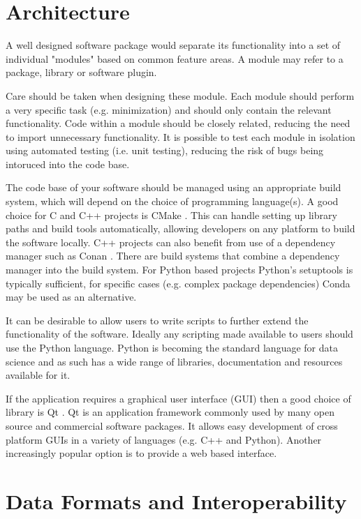 \documentclass[jnr]{iosart2x}
\begin{document}
\section{Architecture}
\label{Architecture}

A well designed software package would separate its functionality into a set of individual "modules" based on common feature areas. 
A module may refer to a package, library or software plugin.

Care should be taken when designing these module. 
Each module should perform a very specific task (e.g. minimization) and should only contain the relevant functionality.
Code within a module should be closely related, reducing the need to import unnecessary functionality.
It is possible to test each module in isolation using automated testing (i.e. unit testing), reducing the risk of bugs being intoruced into the code base.

The code base of your software should be managed using an appropriate build system, which will depend on the choice of programming language(s).
A good choice for C and C++ projects is CMake \cite{CMake}.
This can handle setting up library paths and build tools automatically, allowing developers on any platform to build the software locally.
C++ projects can also benefit from use of a dependency manager such as Conan \cite{Conan}.
There are build systems that combine a dependency manager into the build system.
For Python based projects Python's setuptools is typically sufficient, for specific cases (e.g. complex package dependencies) Conda may be used as an alternative.

It can be desirable to allow users to write scripts to further extend the functionality of the software. 
Ideally any scripting made available to users should use the Python language. 
Python is becoming the standard language for data science and as such has a wide range of libraries, documentation and resources available for it.

If the application requires a graphical user interface (GUI) then a good choice of library is Qt \cite{Qt}.
Qt is an application framework commonly used by many open source and commercial software packages.
It allows easy development of cross platform GUIs in a variety of languages (e.g. C++ and Python).
Another increasingly popular option is to provide a web based interface.

\section{Data Formats and Interoperability}
\label{Data Formats and Interoperability}
\end{document}
